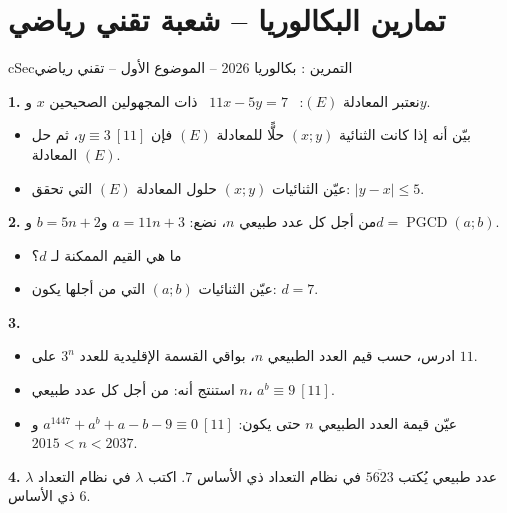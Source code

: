 \documentclass[12pt,a4paper]{article}
\newenvironment{BOX}[2]{\begin{otherlanguage}{english}\begin{arbox}{#1}{#2}}{\end{arbox}\end{otherlanguage}}
\newcounter{exo}
\newenvironment{tamrin}[1]{\stepcounter{exo}\begin{BOX}{cSec}{التمرين \theexo: #1}}{\end{BOX}}
\newcommand{\pgcd}{\operatorname{PGCD}}
\newenvironment{sq}{\begin{itemize}[leftmargin=2.4em,itemsep=3pt]}{\end{itemize}}
\newcommand{\qa}{\item[(أ)]}\newcommand{\qb}{\item[(ب)]}\newcommand{\qc}{\item[(جـ)]}\newcommand{\qd}{\item[(د)]}\newcommand{\qe}{\item[(هـ)]}
\newcommand{\QQ}[1]{\par\smallskip\textbf{#1.} }
\begin{document}
\section{تمارين البكالوريا -- شعبة تقني رياضي}
\begin{tamrin}{بكالوريا 2026 -- الموضوع الأول -- تقني رياضي}
\QQ{1} نعتبر المعادلة $(E)$: \ $11x-5y=7$ \ ذات المجهولين الصحيحين $x$ و$y$.
\begin{sq}
\qa بيّن أنه إذا كانت الثنائية $(x;y)$ حلًّا للمعادلة $(E)$ فإن $y\equiv 3\ [11]$، ثم حل المعادلة $(E)$.
\qb عيّن الثنائيات $(x;y)$ حلول المعادلة $(E)$ التي تحقق: $|y-x|\le 5$.
\end{sq}
\QQ{2} من أجل كل عدد طبيعي $n$، نضع: $a=11n+3$ و$b=5n+2$ و$d=\pgcd(a;b)$.
\begin{sq}
\qa ما هي القيم الممكنة لـ $d$؟
\qb عيّن الثنائيات $(a;b)$ التي من أجلها يكون: $d=7$.
\end{sq}
\QQ{3}
\begin{sq}
\qa ادرس، حسب قيم العدد الطبيعي $n$، بواقي القسمة الإقليدية للعدد $3^n$ على $11$.
\qb استنتج أنه: من أجل كل عدد طبيعي $n$، $a^b\equiv 9\ [11]$.
\qc عيّن قيمة العدد الطبيعي $n$ حتى يكون: $a^{1447}+a^b+a-b-9\equiv 0\ [11]$ و$2015<n<2037$.
\end{sq}
\QQ{4} $\lambda$ عدد طبيعي يُكتب $\overline{5623}$ في نظام التعداد ذي الأساس $7$. اكتب $\lambda$ في نظام التعداد ذي الأساس $6$.
\end{tamrin}
\end{document}
